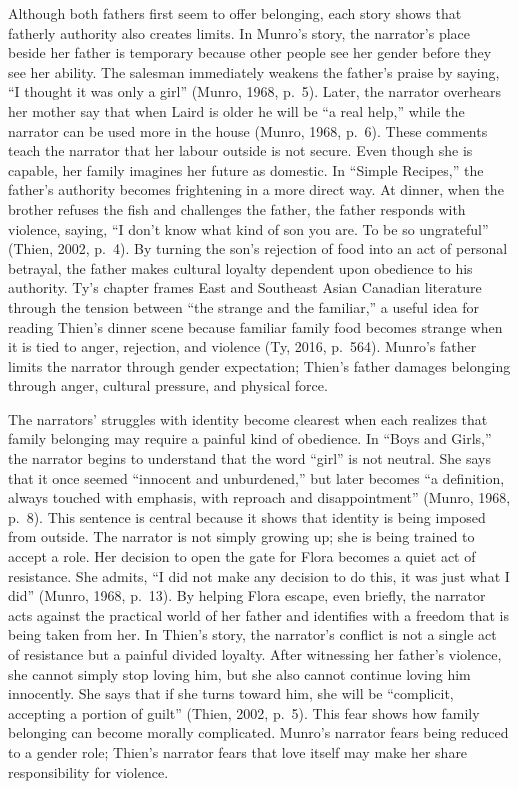 \documentclass[12pt]{article}
\begin{document}
Although both fathers first seem to offer belonging, each story shows that fatherly authority also creates limits. In Munro's story, the narrator's place beside her father is temporary because other people see her gender before they see her ability. The salesman immediately weakens the father's praise by saying, ``I thought it was only a girl'' (Munro, 1968, p.~5). Later, the narrator overhears her mother say that when Laird is older he will be ``a real help,'' while the narrator can be used more in the house (Munro, 1968, p.~6). These comments teach the narrator that her labour outside is not secure. Even though she is capable, her family imagines her future as domestic. In ``Simple Recipes,'' the father's authority becomes frightening in a more direct way. At dinner, when the brother refuses the fish and challenges the father, the father responds with violence, saying, ``I don't know what kind of son you are. To be so ungrateful'' (Thien, 2002, p.~4). By turning the son's rejection of food into an act of personal betrayal, the father makes cultural loyalty dependent upon obedience to his authority. Ty's chapter frames East and Southeast Asian Canadian literature through the tension between ``the strange and the familiar,'' a useful idea for reading Thien's dinner scene because familiar family food becomes strange when it is tied to anger, rejection, and violence (Ty, 2016, p.~564). Munro's father limits the narrator through gender expectation; Thien's father damages belonging through anger, cultural pressure, and physical force.

The narrators' struggles with identity become clearest when each realizes that family belonging may require a painful kind of obedience. In ``Boys and Girls,'' the narrator begins to understand that the word ``girl'' is not neutral. She says that it once seemed ``innocent and unburdened,'' but later becomes ``a definition, always touched with emphasis, with reproach and disappointment'' (Munro, 1968, p.~8). This sentence is central because it shows that identity is being imposed from outside. The narrator is not simply growing up; she is being trained to accept a role. Her decision to open the gate for Flora becomes a quiet act of resistance. She admits, ``I did not make any decision to do this, it was just what I did'' (Munro, 1968, p.~13). By helping Flora escape, even briefly, the narrator acts against the practical world of her father and identifies with a freedom that is being taken from her. In Thien's story, the narrator's conflict is not a single act of resistance but a painful divided loyalty. After witnessing her father's violence, she cannot simply stop loving him, but she also cannot continue loving him innocently. She says that if she turns toward him, she will be ``complicit, accepting a portion of guilt'' (Thien, 2002, p.~5). This fear shows how family belonging can become morally complicated. Munro's narrator fears being reduced to a gender role; Thien's narrator fears that love itself may make her share responsibility for violence.
\end{document}
